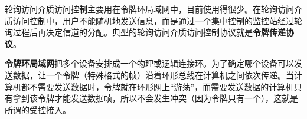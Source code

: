 轮询访问介质访问控制主要用在令牌环局域网中，目前使用得很少。在轮询访问介质访问控制中，用户不能随机地发送信息，而是通过一个集中控制的监控站经过轮询过程后再决定信道的分配。典型的轮询访问介质访问控制协议就是\textbf{{令牌传递协议}}{。}

\textbf{令牌环局域网}把多个设备安排成一个物理或逻辑连接环。为了确定哪个设备可以发送数据，让一个令牌（特殊格式的帧）沿着环形总线在计算机之间依次传递。当计算机都不需要发送数据时，令牌就在环形网上``游荡''，而需要发送数据的计算机只有拿到该令牌才能发送数据帧，所以不会发生冲突（因为令牌只有一个），这就是所谓的受控接入。
